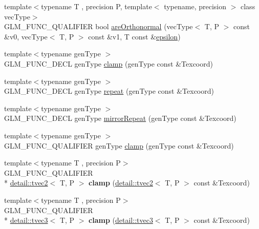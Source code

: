 \begin{DoxyCompactItemize}
\item 
{\footnotesize template$<$typename T , precision P, template$<$ typename, precision $>$ class vec\-Type$>$ }\\G\-L\-M\-\_\-\-F\-U\-N\-C\-\_\-\-Q\-U\-A\-L\-I\-F\-I\-E\-R bool \hyperlink{group__gtx__vector__query_ga89c82bc60e5b84e4489b74c15a134caf}{are\-Orthonormal} (vec\-Type$<$ T, P $>$ const \&v0, vec\-Type$<$ T, P $>$ const \&v1, T const \&\hyperlink{group__gtc__constants_gacb41049b8d22c8aa90e362b96c524feb}{epsilon})
\item 
{\footnotesize template$<$typename gen\-Type $>$ }\\G\-L\-M\-\_\-\-F\-U\-N\-C\-\_\-\-D\-E\-C\-L gen\-Type \hyperlink{group__gtx__wrap_ga6c0cc6bd1d67ea1008d2592e998bad33}{clamp} (gen\-Type const \&Texcoord)
\item 
{\footnotesize template$<$typename gen\-Type $>$ }\\G\-L\-M\-\_\-\-F\-U\-N\-C\-\_\-\-D\-E\-C\-L gen\-Type \hyperlink{group__gtx__wrap_ga809650c6310ea7c42666e918c117fb6f}{repeat} (gen\-Type const \&Texcoord)
\item 
{\footnotesize template$<$typename gen\-Type $>$ }\\G\-L\-M\-\_\-\-F\-U\-N\-C\-\_\-\-D\-E\-C\-L gen\-Type \hyperlink{group__gtx__wrap_ga16a89b0661b60d5bea85137bbae74d73}{mirror\-Repeat} (gen\-Type const \&Texcoord)
\item 
{\footnotesize template$<$typename gen\-Type $>$ }\\G\-L\-M\-\_\-\-F\-U\-N\-C\-\_\-\-Q\-U\-A\-L\-I\-F\-I\-E\-R gen\-Type \hyperlink{group__gtx__wrap_ga6c0cc6bd1d67ea1008d2592e998bad33}{clamp} (gen\-Type const \&Texcoord)
\item 
\hypertarget{namespaceglm_ac07453cc5dd0ddf29280decfd676e7a1}{{\footnotesize template$<$typename T , precision P$>$ }\\G\-L\-M\-\_\-\-F\-U\-N\-C\-\_\-\-Q\-U\-A\-L\-I\-F\-I\-E\-R \\*
\hyperlink{structglm_1_1detail_1_1tvec2}{detail\-::tvec2}$<$ T, P $>$ {\bfseries clamp} (\hyperlink{structglm_1_1detail_1_1tvec2}{detail\-::tvec2}$<$ T, P $>$ const \&Texcoord)}\label{namespaceglm_ac07453cc5dd0ddf29280decfd676e7a1}

\item 
\hypertarget{namespaceglm_a378e165eb674a1767e7532381503c45a}{{\footnotesize template$<$typename T , precision P$>$ }\\G\-L\-M\-\_\-\-F\-U\-N\-C\-\_\-\-Q\-U\-A\-L\-I\-F\-I\-E\-R \\*
\hyperlink{structglm_1_1detail_1_1tvec3}{detail\-::tvec3}$<$ T, P $>$ {\bfseries clamp} (\hyperlink{structglm_1_1detail_1_1tvec3}{detail\-::tvec3}$<$ T, P $>$ const \&Texcoord)}\label{namespaceglm_a378e165eb674a1767e7532381503c45a}


\end{DoxyCompactItemize}

